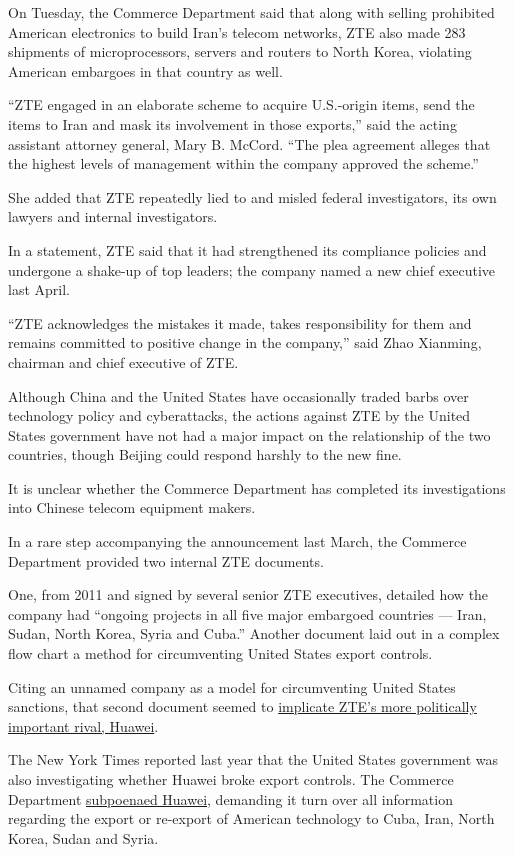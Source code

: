 On Tuesday, the Commerce Department said that along with selling
prohibited American electronics to build Iran's telecom networks, ZTE
also made 283 shipments of microprocessors, servers and routers to North
Korea, violating American embargoes in that country as well.

``ZTE engaged in an elaborate scheme to acquire U.S.-origin items, send
the items to Iran and mask its involvement in those exports,'' said the
acting assistant attorney general, Mary B. McCord. ``The plea agreement
alleges that the highest levels of management within the company
approved the scheme.''

She added that ZTE repeatedly lied to and misled federal investigators,
its own lawyers and internal investigators.

In a statement, ZTE said that it had strengthened its compliance
policies and undergone a shake-up of top leaders; the company named a
new chief executive last April.

``ZTE acknowledges the mistakes it made, takes responsibility for them
and remains committed to positive change in the company,'' said Zhao
Xianming, chairman and chief executive of ZTE.

Although China and the United States have occasionally traded barbs over
technology policy and cyberattacks, the actions against ZTE by the
United States government have not had a major impact on the relationship
of the two countries, though Beijing could respond harshly to the new
fine.

It is unclear whether the Commerce Department has completed its
investigations into Chinese telecom equipment makers.

In a rare step accompanying the announcement last March, the Commerce
Department provided two internal ZTE documents.

One, from 2011 and signed by several senior ZTE executives, detailed how
the company had ``ongoing projects in all five major embargoed countries
--- Iran, Sudan, North Korea, Syria and Cuba.'' Another document laid
out in a complex flow chart a method for circumventing United States
export controls.

Citing an unnamed company as a model for circumventing United States
sanctions, that second document seemed to
\href{https://www.nytimes3xbfgragh.onion/2016/03/19/technology/zte-document-raises-questions-about-huawei-and-sanctions.html}{implicate
ZTE's more politically important rival, Huawei}.

The New York Times reported last year that the United States government
was also investigating whether Huawei broke export controls. The
Commerce Department
\href{https://www.nytimes3xbfgragh.onion/2016/06/03/technology/huawei-technologies-subpoena-iran-north-korea.html}{subpoenaed
Huawei}, demanding it turn over all information regarding the export or
re-export of American technology to Cuba, Iran, North Korea, Sudan and
Syria.

